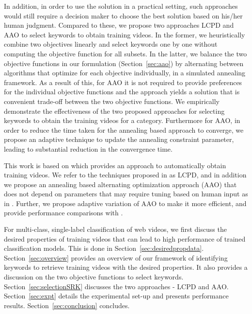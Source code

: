 In addition, in order to use the solution in a practical setting, such approaches would still require a decision maker to choose the best solution based on his/her human judgment. Compared to these, we propose two approaches LCPD and AAO to select keywords to obtain training videos. In the former, we heuristically combine two objectives linearly and select keywords one by one without computing the objective function for all subsets. In the latter, we balance the two objective functions in our formulation (Section~\ref{sec:aao}) by alternating between algorithms that optimize for each objective individually, in a simulated annealing framework. As a result of this, for AAO it is not required to provide preferences for the individual objective functions and the approach yields a solution that is convenient trade-off between the two objective functions. We empirically demonstrate the effectiveness of the two proposed approaches for selecting keywords to obtain the training videos for a category. Furthermore for AAO, in order to reduce the time taken for the annealing based approach to converge, we propose an adaptive technique to update the annealing constraint parameter, leading to substantial reduction in the convergence time. 

This work is based on \cite{VermaWI13} which provides an approach to automatically obtain training videos. We refer to the techniques proposed in \cite{VermaWI13} as LCPD, and in addition we propose an annealing based alternating optimization approach (AAO) that does not depend on parameters that may require tuning based on human input as in \cite{VermaWI13}. Further, we propose adaptive variation of AAO to make it more efficient, and provide performance comparisons with \cite{VermaWI13}. 

For multi-class, single-label classification of web videos, we first discuss the desired properties of training videos that can lead to high performance of trained classification models. This is done in Section~\ref{sec:desiredpropdata}. Section~\ref{sec:overview} provides an overview of our framework of identifying keywords to retrieve training videos with the desired properties. It also provides a discussion on the two objective functions to select keywords. Section~\ref{sec:selectionSRK} discusses the two approaches - LCPD and AAO. Section~\ref{sec:expt} details the experimental set-up and presents performance results. Section~\ref{sec:conclusion} concludes.
